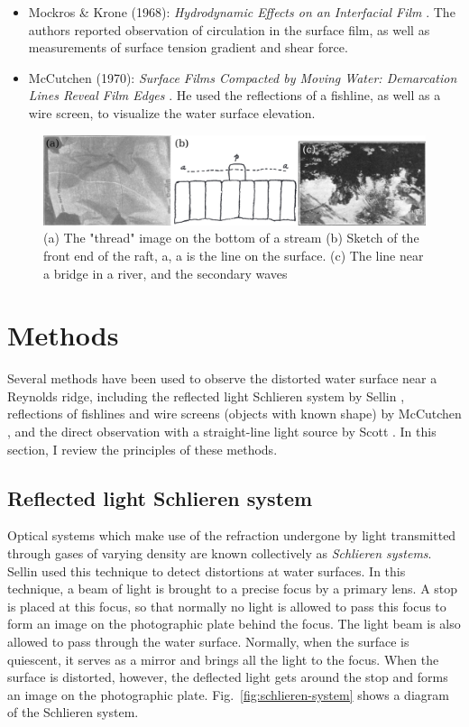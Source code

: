 \documentclass[12pt]{article}
\begin{document}
\begin{itemize}
    \item Mockros \& Krone (1968): \emph{Hydrodynamic Effects on an Interfacial Film} \cite{Mockros1968}. The authors reported observation of circulation in the surface film, as well as measurements of surface tension gradient and shear force. 
    \item McCutchen (1970): \emph{Surface Films Compacted by Moving Water: Demarcation Lines Reveal Film Edges} \cite{McCutchen1970}. He used the reflections of a fishline, as well as a wire screen, to visualize the water surface elevation. 
\end{itemize}

\begin{figure}
    \centering
    \includegraphics[width=\textwidth]{Figures/Reynolds-ridge-examples.pdf}
    \caption{(a) The "thread" image on the bottom of a stream (b) Sketch of the front end of the raft, a, a is the line on the surface. (c) The line near a bridge in a river, and the secondary waves }
    \label{fig:rr-examples}
\end{figure}

\section{Methods}

Several methods have been used to observe the distorted water surface near a Reynolds ridge, including the reflected light Schlieren system by Sellin \cite{Sellin1968}, reflections of fishlines and wire screens (objects with known shape) by McCutchen \cite{McCutchen1970}, and the direct observation with a straight-line light source by Scott \cite{Scott1982}. In this section, I review the principles of these methods.

\subsection{Reflected light Schlieren system}

Optical systems which make use of the refraction undergone by light transmitted through gases of varying density are known collectively as \emph{Schlieren systems}. Sellin used this technique to detect distortions at water surfaces. In this technique, a beam of light is brought to a precise focus by a primary lens. A stop is placed at this focus, so that normally no light is allowed to pass this focus to form an image on the photographic plate behind the focus. The light beam is also allowed to pass through the water surface. Normally, when the surface is quiescent, it serves as a mirror and brings all the light to the focus. When the surface is distorted, however, the deflected light gets around the stop and forms an image on the photographic plate. Fig.~\ref{fig:schlieren-system} shows a diagram of the Schlieren system.
\end{document}
